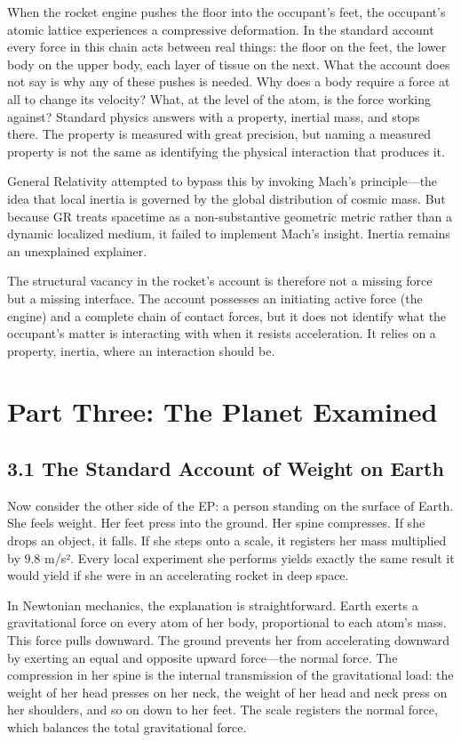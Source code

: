 \documentclass[11pt]{article}
\begin{document}
When the rocket engine pushes the floor into the occupant's feet, the occupant's atomic lattice experiences a compressive deformation. In the standard account every force in this chain acts between real things: the floor on the feet, the lower body on the upper body, each layer of tissue on the next. What the account does not say is why any of these pushes is needed. Why does a body require a force at all to change its velocity? What, at the level of the atom, is the force working against? Standard physics answers with a property, inertial mass, and stops there. The property is measured with great precision, but naming a measured property is not the same as identifying the physical interaction that produces it.

General Relativity attempted to bypass this by invoking Mach's principle---the idea that local inertia is governed by the global distribution of cosmic mass. But because GR treats spacetime as a non-substantive geometric metric rather than a dynamic localized medium, it failed to implement Mach's insight. Inertia remains an unexplained explainer.

The structural vacancy in the rocket's account is therefore not a missing force but a missing interface. The account possesses an initiating active force (the engine) and a complete chain of contact forces, but it does not identify what the occupant's matter is interacting with when it resists acceleration. It relies on a property, inertia, where an interaction should be.

\section{Part Three: The Planet Examined}

\subsection{3.1 The Standard Account of Weight on Earth}

Now consider the other side of the EP: a person standing on the surface of Earth. She feels weight. Her feet press into the ground. Her spine compresses. If she drops an object, it falls. If she steps onto a scale, it registers her mass multiplied by 9.8 m/s². Every local experiment she performs yields exactly the same result it would yield if she were in an accelerating rocket in deep space.

In Newtonian mechanics, the explanation is straightforward. Earth exerts a gravitational force on every atom of her body, proportional to each atom's mass. This force pulls downward. The ground prevents her from accelerating downward by exerting an equal and opposite upward force---the normal force. The compression in her spine is the internal transmission of the gravitational load: the weight of her head presses on her neck, the weight of her head and neck press on her shoulders, and so on down to her feet. The scale registers the normal force, which balances the total gravitational force.
\end{document}
